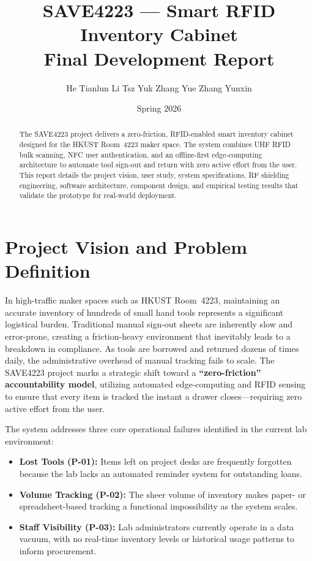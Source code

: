 \documentclass[12pt, a4paper]{article}
\title{%
  \textbf{SAVE4223 — Smart RFID Inventory Cabinet}\\[6pt]
  \large Final Development Report
}
\author{
  He Tianlun \quad Li Tsz Yuk \quad Zhang Yue \quad Zhang Yunxin
}
\date{Spring 2026}
\begin{document}
\maketitle
\thispagestyle{empty}

\begin{abstract}
The SAVE4223 project delivers a zero-friction, RFID-enabled smart inventory cabinet designed for the HKUST Room~4223 maker space.
The system combines UHF RFID bulk scanning, NFC user authentication, and an offline-first edge-computing architecture to automate tool sign-out and return with zero active effort from the user.
This report details the project vision, user study, system specifications, RF shielding engineering, software architecture, component design, and empirical testing results that validate the prototype for real-world deployment.
\end{abstract}

\newpage
\tableofcontents
\newpage

\section{Project Vision and Problem Definition}
\label{sec:vision}

In high-traffic maker spaces such as HKUST Room~4223, maintaining an accurate inventory of hundreds of small hand tools represents a significant logistical burden.
Traditional manual sign-out sheets are inherently slow and error-prone, creating a friction-heavy environment that inevitably leads to a breakdown in compliance.
As tools are borrowed and returned dozens of times daily, the administrative overhead of manual tracking fails to scale.
The SAVE4223 project marks a strategic shift toward a \textbf{``zero-friction'' accountability model}, utilizing automated edge-computing and RFID sensing to ensure that every item is tracked the instant a drawer closes---requiring zero active effort from the user.

The system addresses three core operational failures identified in the current lab environment:

\begin{itemize}[nosep]
  \item \textbf{Lost Tools (P-01):} Items left on project desks are frequently forgotten because the lab lacks an automated reminder system for outstanding loans.
  \item \textbf{Volume Tracking (P-02):} The sheer volume of inventory makes paper- or spreadsheet-based tracking a functional impossibility as the system scales.
  \item \textbf{Staff Visibility (P-03):} Lab administrators currently operate in a data vacuum, with no real-time inventory levels or historical usage patterns to inform procurement.
\end{itemize}
\end{document}
